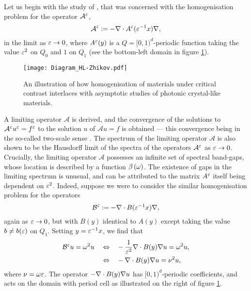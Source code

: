 Let us begin with the study of \cite{zhikov2000extension}, that was concerned with the homogenisation problem for the operator $\mathcal{A}^{\varepsilon}$,
\begin{align*}
	\mathcal{A}^{\varepsilon} := -\nabla\cdot A^{\varepsilon}(\varepsilon^{-1}x)\nabla,
\end{align*}
in the limit as $\varepsilon\rightarrow0$, where $A^{\varepsilon}(y)$ is a $Q=[0,1)^d$-periodic function taking the value $\varepsilon^2$ on $Q_0$ and $1$ on $Q_1$ (see the bottom-left domain in figure \ref{fig:Diagram_HL-Zhikov}).
\begin{figure}[h]
	\centering
	\texttt{[image: Diagram\_HL-Zhikov.pdf]}
	\caption{\label{fig:Diagram_HL-Zhikov} An illustration of how homogenisation of materials under critical contrast interlaces with asymptotic studies of photonic crystal-like materials.}
\end{figure}
A limiting operator $\mathcal{A}$ is derived, and the convergence of the solutions to $\mathcal{A}^{\varepsilon}u^{\varepsilon}=f^{\varepsilon}$ to the solution $u$ of $\mathcal{A}u=f$ is obtained --- this convergence being in the so-called two-scale sense .
The spectrum of the limiting operator $\mathcal{A}$ is also shown to be the Hausdorff limit of the spectra of the operators $\mathcal{A}^{\varepsilon}$ as $\varepsilon\rightarrow0$.
Crucially, the limiting operator $\mathcal{A}$ possesses an infinite set of spectral band-gaps, whose location is described by a function $\beta\left( \omega \right)$.
The existence of gaps in the limiting spectrum is unusual, and can be attributed to the matrix $A^{\varepsilon}$ itself being dependent on $\varepsilon^2$.
Indeed, suppose we were to consider the similar homogenisation problem for the operators
\begin{align*}
	\mathcal{B}^{\varepsilon} := -\nabla\cdot B(\varepsilon^{-1}x)\nabla,
\end{align*}
again as $\varepsilon\rightarrow0$, but with $B(y)$ identical to $A(y)$ except taking the value $b\neq b(\varepsilon)$ on $Q_1$.
Setting $y=\varepsilon^{-1}x$, we find that
\begin{align*}
	\mathcal{B}^{\varepsilon}u = \omega^2 u 
	\quad\Leftrightarrow \quad &
	-\frac{1}{\varepsilon^2}\nabla\cdot B(y)\nabla u = \omega^2 u, \\
	\quad\Leftrightarrow \quad &
	-\nabla\cdot B(y)\nabla u = \nu^2 u,
\end{align*}
where $\nu = \omega\varepsilon$.
The operator $-\nabla\cdot B(y)\nabla u$ has $[0,1)^d$-periodic coefficients, and acts on the domain with period cell as illustrated on the right of figure \ref{fig:Diagram_HL-Zhikov}.
